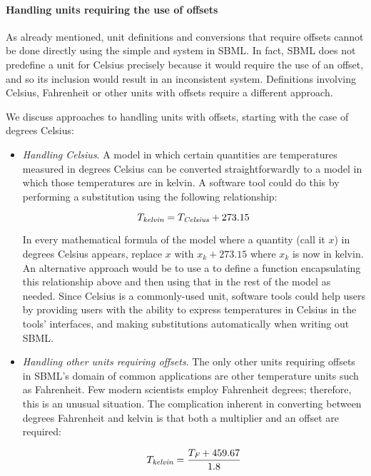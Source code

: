 \paragraph{Handling units requiring the use of offsets}
\label{sec:bp:unitdefinitions:offset}

As already mentioned, unit definitions and conversions that
require offsets cannot be done directly using the simple
\UnitDefinition and \Unit system in SBML.  In fact, SBML does not
predefine a unit for Celsius precisely because it would require
the use of an offset, and so its inclusion would result in an
inconsistent system.  Definitions involving Celsius, Fahrenheit or
other units with offsets require a different approach.

We discuss approaches to handling units with offsets, starting
with the case of degrees Celsius:
\begin{itemize}

\item \emph{Handling Celsius}.  A model in which certain
  quantities are temperatures measured in degrees Celsius can be
  converted straightforwardly to a model in which those
  temperatures are in kelvin.  A software tool could do this by
  performing a substitution using the following relationship:
  \begin{linenomath}
    \begin{equation*}
      T_\emph{kelvin} = T_\emph{Celsius} + 273.15
    \end{equation*}
  \end{linenomath}
  In every mathematical formula of the model where a quantity
  (call it $x$) in degrees Celsius appears, replace $x$ with $x_k
  + 273.15$ where $x_k$ is now in kelvin.  An alternative approach
  would be to use a \FunctionDefinition to define a function
  encapsulating this relationship above and then using that in the
  rest of the model as needed.  Since Celsius is a commonly-used
  unit, software tools could help users by providing users with
  the ability to express temperatures in Celsius in the tools'
  interfaces, and making substitutions automatically when writing
  out SBML.

\item \emph{Handling other units requiring offsets}.  The only
  other units requiring offsets in SBML's domain of common
  applications are other temperature units such as Fahrenheit.
  Few modern scientists employ Fahrenheit degrees; therefore, this
  is an unusual situation.  The complication inherent in
  converting between degrees Fahrenheit and kelvin is that both a
  multiplier and an offset are required:
  \begin{linenomath}
    \begin{equation*}
      T_\emph{kelvin} = \frac{T_\emph{F} + 459.67}{1.8}
      \label{eq:fah-kelvin}
    \end{equation*}
  \end{linenomath}


\end{itemize}

